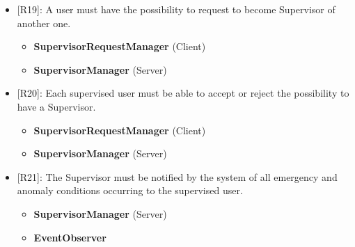 \begin{itemize}[itemsep=0em]
	\item {[R19]: A user must have the possibility to request to become Supervisor of another one.}
	\begin{itemize}
		\item {\textbf{SupervisorRequestManager} (Client)}
		\item {\textbf{SupervisorManager} (Server)}
	\end{itemize}   
	\item {[R20]: Each supervised user must be able to accept or reject the possibility to have a Supervisor.}
	\begin{itemize}
		\item {\textbf{SupervisorRequestManager} (Client)}
		\item {\textbf{SupervisorManager} (Server)}
	\end{itemize}   
	\item {[R21]: The Supervisor must be notified by the system of all emergency and anomaly conditions occurring to the supervised user.}
	\begin{itemize}
		\item {\textbf{SupervisorManager} (Server)}
		\item {\textbf{EventObserver}}
	\end{itemize}   
	
\end{itemize}


